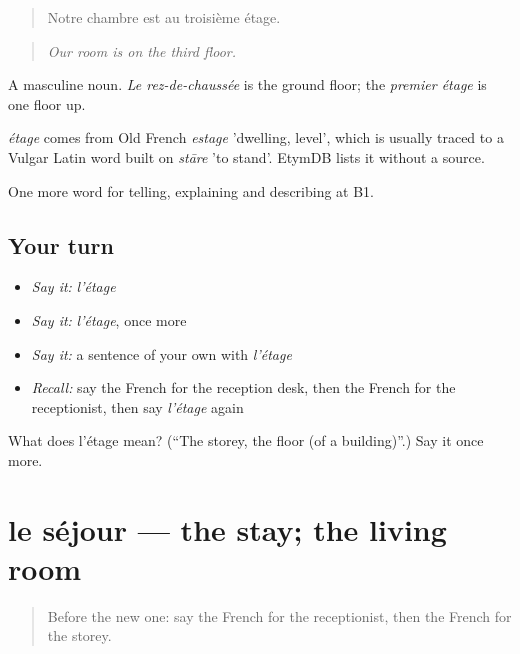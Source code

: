 \begin{quote}
Notre chambre est au troisième étage.
\end{quote}

\begin{quote}
\emph{Our room is on the third floor.}
\end{quote}

A masculine noun. \emph{Le rez-de-chaussée} is the ground floor; the \emph{premier étage} is one floor up.

\begin{cousinweb}
\emph{étage} comes from Old French \emph{estage} 'dwelling, level', which is usually traced to a Vulgar Latin word built on \emph{stāre} 'to stand'. EtymDB lists it without a source.
\end{cousinweb}

\begin{grammarlens}[title={What you've built}]
One more word for telling, explaining and describing at B1.
\end{grammarlens}

\subsection*{Your turn}
\begin{itemize}
\raggedright
  \item \emph{Say it:} \emph{l'étage}
  \item \emph{Say it:} \emph{l'étage}, once more
  \item \emph{Say it:} a sentence of your own with \emph{l'étage}
  \item \emph{Recall:} say the French for the reception desk, then the French for the receptionist, then say \emph{l'étage} again
\end{itemize}

\begin{tcolorbox}[breakable,colback=teal!4,colframe=teal!35!black,title={Before you move on}]
What does l'étage mean? (\textquotedblleft{}The storey, the floor (of a building)\textquotedblright{}.) Say it once more.
\end{tcolorbox}
\section[le séjour]{le séjour — the stay; the living room}

\label{lesson:FR-C426-sejour}



\begin{quote}
Before the new one: say the French for the receptionist, then the French for the storey.
\end{quote}

